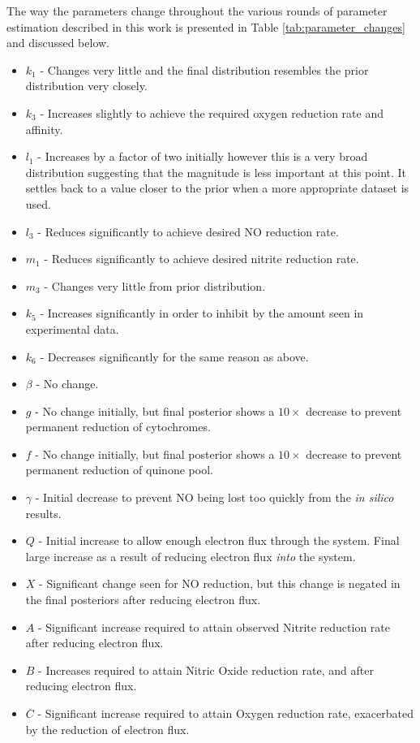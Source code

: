 The way the parameters change throughout the various rounds of parameter estimation described in this work is presented in Table \ref{tab:parameter_changes} and discussed below.
\begin{itemize}
\setlength{\itemsep}{0cm}
 \item $k_1$ - Changes very little and the final distribution resembles the prior distribution very closely.
 \item $k_3$ - Increases slightly to achieve the required oxygen reduction rate and affinity.
 \item $l_1$ - Increases by a factor of two initially however this is a very broad distribution suggesting that the magnitude is less important at this point. It settles back to a value closer to the prior when a more appropriate dataset is used.
 \item $l_3$ - Reduces significantly to achieve desired NO reduction rate.
 \item $m_1$ - Reduces significantly to achieve desired nitrite reduction rate.
 \item $m_3$ - Changes very little from prior distribution.
 \item $k_5$ - Increases significantly in order to inhibit \cbbthree{} by the amount seen in experimental data.
 \item $k_6$ - Decreases significantly for the same reason as above.
 \item $\beta$ - No change.
 \item $g$ - No change initially, but final posterior shows a $10\times$ decrease to prevent permanent reduction of cytochromes.
 \item $f$ - No change initially, but final posterior shows a $10\times$ decrease to prevent permanent reduction of quinone pool.
 \item $\gamma$ - Initial decrease to prevent NO being lost too quickly from the \textit{in silico} results.
 \item $Q$ - Initial increase to allow enough electron flux through the system. Final large increase as a result of reducing electron flux \textit{into} the system.
 \item $X$ - Significant change seen for NO reduction, but this change is negated in the final posteriors after reducing electron flux.
 \item $A$ - Significant increase required to attain observed Nitrite reduction rate after reducing electron flux.
 \item $B$ - Increases required to attain Nitric Oxide reduction rate, and after reducing electron flux.
 \item $C$ - Significant increase required to attain Oxygen reduction rate, exacerbated by the reduction of electron flux.
\end{itemize}

